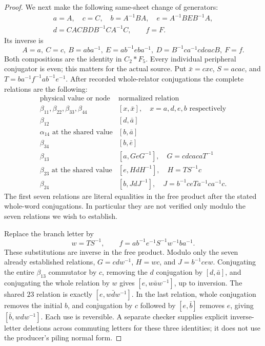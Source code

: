 \begin{proof}
We next make the following same-sheet change of generators:
\begin{equation}\label{eq:B110-Nielsen}
 \begin{gathered}
 a=A,\quad c=C,\quad b=A^{-1}BA,\quad
 e=A^{-1}BEB^{-1}A,\\
 d=CACBD B^{-1}CA^{-1}C,\qquad f=F.
 \end{gathered}
\end{equation}
Its inverse is
\[
 A=a,\ C=c,\ B=aba^{-1},\ E=ab^{-1}eba^{-1},\
 D=B^{-1}ca^{-1}cdcacB,\ F=f.
\]
Both compositions are the identity in $C_2*F_5$. Every individual
peripheral conjugator is even; this matters for the actual source.
Put $\bar x=cxc$, $S=acac$, and
$T=ba^{-1}f^{-1}ab^{-1}e^{-1}$. After recorded whole-relator
conjugations the complete relations are the following:
\begin{equation}\label{eq:B110-ten}
 \begin{array}{c|l}
 \text{physical value or node}&\text{normalized relation}\\\hline
 \beta_{11},\beta_{22},\beta_{33},\beta_{44}
   &[x,\bar x],\quad x=a,d,e,b\text{ respectively}\\
 \beta_{12}&[d,\bar a]\\
 \alpha_{14}\text{ at the shared value}&[b,\bar a]\\
 \beta_{34}&[b,\bar e]\\
 \beta_{13}&[a,G eG^{-1}],\quad G=cdcac aT^{-1}\\
 \beta_{23}\text{ at the shared value}&[e,HdH^{-1}],\quad H=TS^{-1}c\\
 \beta_{24}&[b,JdJ^{-1}],\quad J=b^{-1}ceTa^{-1}ca^{-1}c.
 \end{array}
\end{equation}
The first seven relations are literal equalities in the free product
after the stated whole-word conjugations. In particular they are not
verified only modulo the seven relations we wish to establish.

Replace the branch letter by
\begin{equation}\label{eq:B110-w}
 w=TS^{-1},\qquad f=ab^{-1}e^{-1}S^{-1}w^{-1}ba^{-1}.
\end{equation}
These substitutions are inverse in the free product. Modulo only
the seven already established relations, $G=cdw^{-1}$,
$H=wc$, and $J=b^{-1}cew$. Conjugating the entire $\beta_{13}$
commutator by $c$, removing the $d$ conjugation by $[d,\bar a]$,
and conjugating the whole relation by $w$ gives
$[e,w\bar a w^{-1}]$, up to inversion. The shared $23$ relation
is exactly $[e,w\bar d w^{-1}]$. In the last relation, whole
conjugation removes the initial $b$, and conjugation by $c$ followed
by $[e,\bar b]$ removes $e$, giving $[\bar b,wdw^{-1}]$.
Each use is reversible. A separate checker supplies explicit
inverse-letter deletions across commuting letters for these three
identities; it does not use the producer's piling normal form.


\end{proof}
